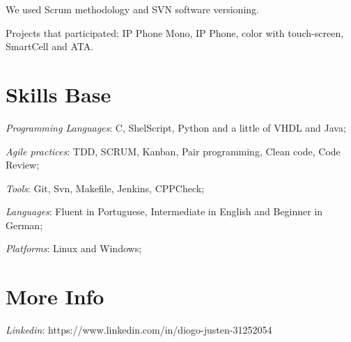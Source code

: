 \documentclass[margin]{res}
\begin{document}
\begin{resume}
We used Scrum methodology and SVN software versioning.

Projects that participated: IP Phone Mono, IP Phone, color with touch-screen, SmartCell and ATA. 

\section{Skills Base} \textit{Programming Languages}: C, ShelScript, Python and a little of VHDL and Java;

	\textit{Agile practices}: TDD, SCRUM, Kanban, Pair programming, Clean code, Code Review;
	
	\textit{Tools}: Git, Svn, Makefile, Jenkins, CPPCheck;
	
	\textit{Languages}: Fluent in Portuguese, Intermediate in English and Beginner in German;

	\textit{Platforms}: Linux and Windows;
	
\section{More Info} \textit{Linkedin}: https://www.linkedin.com/in/diogo-justen-31252054

\end{resume}
\end{document}
